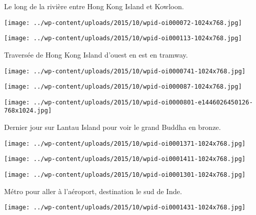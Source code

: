 \pagebreak
 Le long de la rivière entre Hong Kong Island et Kowloon. 
\begin{center} \texttt{[image: ../wp-content/uploads/2015/10/wpid-oi000072-1024x768.jpg]} \end{center}
\begin{center} \texttt{[image: ../wp-content/uploads/2015/10/wpid-oi000113-1024x768.jpg]} \end{center}
 
 \pagebreak
 Traversée de Hong Kong Island d'ouest en est en tramway. 
\begin{center} \texttt{[image: ../wp-content/uploads/2015/10/wpid-oi0000741-1024x768.jpg]} \end{center}
\begin{center} \texttt{[image: ../wp-content/uploads/2015/10/wpid-oi000087-1024x768.jpg]} \end{center}
\begin{center} \texttt{[image: ../wp-content/uploads/2015/10/wpid-oi0000801-e1446026450126-768x1024.jpg]} \end{center}

 Dernier jour sur Lantau Island pour voir le grand Buddha en bronze. 
\begin{center} \texttt{[image: ../wp-content/uploads/2015/10/wpid-oi0001371-1024x768.jpg]} \end{center}
\begin{center} \texttt{[image: ../wp-content/uploads/2015/10/wpid-oi0001411-1024x768.jpg]} \end{center}
\begin{center} \texttt{[image: ../wp-content/uploads/2015/10/wpid-oi0001301-1024x768.jpg]} \end{center}

\pagebreak
 Métro pour aller à l'aéroport, destination le sud de Inde. 
\begin{center} \texttt{[image: ../wp-content/uploads/2015/10/wpid-oi0001431-1024x768.jpg]} \end{center}